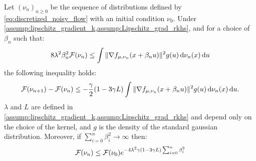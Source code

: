 \begin{proposition}\label{prop:decreasing_loss_iterations}
	Let $(\nu_n)_{n\geq 0}$ be the sequence of distributions defined by \cref{eq:discretized_noisy_flow} with an initial condition $\nu_0$. Under \cref{assump:lipschitz_gradient_k,assump:Lipschitz_grad_rkhs}, and for a choice of $\beta_n$ such that:
	\begin{align}\label{eq:control_level_noise}
		8\lambda^2\beta_n^2 {{\mathcal F}}(\nu_n) \leq \int \Vert \nabla f_{\mu,\nu_n}(x+\beta_n u) \Vert^2 g(u) \mathop{}\!\mathrm{d} \nu_n(x)\mathop{}\!\mathrm{d} u   
	\end{align}
	 the following inequality holds:
	\begin{align}\label{eq:decreasing_loss_iterations}
		{{\mathcal F}}(\nu_{n+1}) - {{\mathcal F}}(\nu_n  ) \leq -\frac{\gamma}{2}(1-3\gamma L)\int \Vert \nabla f_{\mu,\nu_n}(x+\beta_n u) \Vert^2 g(u) \mathop{}\!\mathrm{d}\nu_n(x) \mathop{}\!\mathrm{d} u.
	\end{align}
$\lambda$ and $L$ are defined in \cref{assump:lipschitz_gradient_k,assump:Lipschitz_grad_rkhs} and depend only on the choice of the kernel, and $g$ is the density of the standard gaussian distribution. Moreover, if  $\sum_{i=0}^n \beta_i^2 \rightarrow \infty $ then:
\begin{align}
{{\mathcal F}}(\nu_n)\leq {{\mathcal F}}(\nu_0) e^{-4\lambda^2\gamma(1-3\gamma L)\sum_{i=0}^n \beta^2_i}
\end{align}
\end{proposition}

